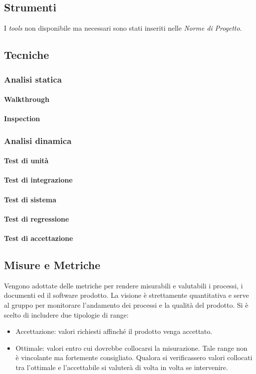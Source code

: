 	\subsection{Strumenti}
		I \emph{tools} non disponibile ma necessari sono stati inseriti nelle \emph{Norme di Progetto}. %
	
	\subsection{Tecniche}
		\subsubsection{Analisi statica}
			\paragraph{Walkthrough}
			\paragraph{Inspection}
		\subsubsection{Analisi dinamica}
			\paragraph{Test di unità}
			\paragraph{Test di integrazione}
			\paragraph{Test di sistema}
			\paragraph{Test di regressione}
			\paragraph{Test di accettazione}
	
	\subsection{Misure e Metriche}
	Vengono adottate delle metriche per rendere misurabili e valutabili i processi, i documenti ed il software prodotto. La visione è strettamente quantitativa e serve al gruppo per monitorare l'andamento dei processi e la qualità del prodotto. Si è scelto di includere due tipologie di range:
	\begin{itemize}
		\item Accettazione: valori richiesti affinché il prodotto venga accettato.
		\item Ottimale: valori entro cui dovrebbe collocarsi la misurazione. Tale range non è vincolante ma fortemente consigliato. Qualora si verificassero valori collocati tra l'ottimale e l'accettabile si valuterà di volta in volta se intervenire.
	\end{itemize}
		
